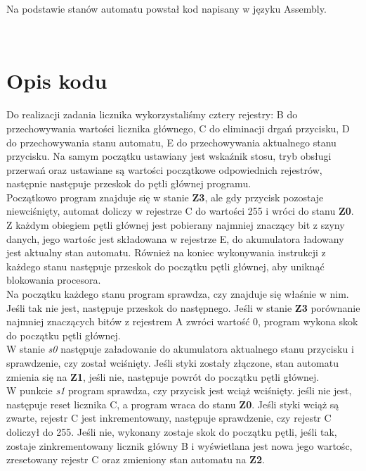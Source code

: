 \documentclass[fleqn]{article}
\begin{document}
Na podstawie stanów automatu powstał kod napisany w języku Assembly.

\noindent\begin{minipage}{.45\textwidth}
	
\end{minipage}\hfill
\noindent\begin{minipage}{.45\textwidth}
	
\end{minipage}\hfill
\\
\section{Opis kodu}
Do realizacji zadania licznika wykorzystaliśmy cztery rejestry: B do przechowywania wartości licznika głównego, C do eliminacji drgań przycisku, D do przechowywania stanu automatu, E do przechowywania aktualnego stanu przycisku.
Na samym początku ustawiany jest wskaźnik stosu, tryb obsługi przerwań oraz ustawiane są wartości początkowe odpowiednich rejestrów, następnie następuje  przeskok do pętli głównej programu. \\
Początkowo program znajduje się w stanie \textbf{Z3}, ale gdy przycisk pozostaje niewciśnięty,  automat doliczy w rejestrze C do wartości 255 i wróci do stanu \textbf{Z0}.\\
Z każdym obiegiem pętli głównej jest pobierany najmniej znaczący bit z szyny danych, jego wartośc jest składowana w rejestrze E, do akumulatora ładowany jest aktualny stan automatu. Również na koniec wykonywania instrukcji z każdego stanu następuje przeskok do początku pętli głównej, aby uniknąć blokowania procesora.\\
Na początku każdego stanu program sprawdza, czy znajduje się właśnie w nim. Jeśli tak nie jest, następuje przeskok do następnego. Jeśli w stanie \textbf{Z3} porównanie najmniej znaczących bitów z rejestrem A zwróci wartość 0, program wykona skok do początku pętli głównej.\\
W stanie \textit{s0} następuje załadowanie do akumulatora aktualnego stanu przycisku i sprawdzenie, czy został wciśnięty. Jeśli styki zostały złączone, stan automatu zmienia się na \textbf{Z1}, jeśli nie, następuje powrót do początku pętli głównej.\\
W punkcie \textit{s1} program sprawdza, czy przycisk jest wciąż wciśnięty. jeśli nie jest, następuje reset licznika C, a program wraca do stanu \textbf{Z0}. Jeśli styki wciąż są zwarte, rejestr C jest inkrementowany, następuje sprawdzenie, czy rejestr C doliczył do 255. Jeśli nie, wykonany zostaje skok do początku pętli, jeśli tak, zostaje zinkrementowany licznik główny B i wyświetlana jest nowa jego wartośc, zresetowany rejestr C oraz zmieniony stan automatu na \textbf{Z2}.\\
\end{document}
